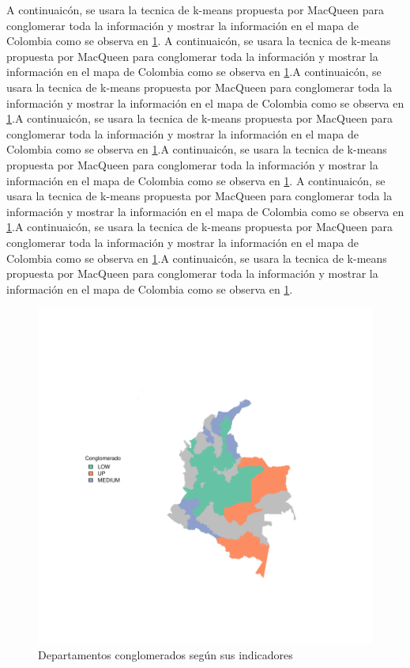 \documentclass{article}
\begin{document}
A continuaicón, se usara la tecnica de k-means propuesta por MacQueen \cite{macqueen_methods_nodate} para conglomerar toda la información y mostrar la información en el mapa de Colombia como se observa en \ref{clustmap}. A continuaicón, se usara la tecnica de k-means propuesta por MacQueen \cite{macqueen_methods_nodate} para conglomerar toda la información y mostrar la información en el mapa de Colombia como se observa en \ref{clustmap}.A continuaicón, se usara la tecnica de k-means propuesta por MacQueen \cite{macqueen_methods_nodate} para conglomerar toda la información y mostrar la información en el mapa de Colombia como se observa en \ref{clustmap}.A continuaicón, se usara la tecnica de k-means propuesta por MacQueen \cite{macqueen_methods_nodate} para conglomerar toda la información y mostrar la información en el mapa de Colombia como se observa en \ref{clustmap}.A continuaicón, se usara la tecnica de k-means propuesta por MacQueen \cite{macqueen_methods_nodate} para conglomerar toda la información y mostrar la información en el mapa de Colombia como se observa en \ref{clustmap}. A continuaicón, se usara la tecnica de k-means propuesta por MacQueen \cite{macqueen_methods_nodate} para conglomerar toda la información y mostrar la información en el mapa de Colombia como se observa en \ref{clustmap}.A continuaicón, se usara la tecnica de k-means propuesta por MacQueen \cite{macqueen_methods_nodate} para conglomerar toda la información y mostrar la información en el mapa de Colombia como se observa en \ref{clustmap}.A continuaicón, se usara la tecnica de k-means propuesta por MacQueen \cite{macqueen_methods_nodate} para conglomerar toda la información y mostrar la información en el mapa de Colombia como se observa en \ref{clustmap}.




\begin{figure}[h]
\centering
\begin{adjustbox}{}

\includegraphics{ProyectoFinal-plotMapa}
\end{adjustbox}
\caption{Departamentos conglomerados según sus indicadores}\label{clustmap}
\end{figure}


\renewcommand{\refname}{Bibliografia}

\end{document}
